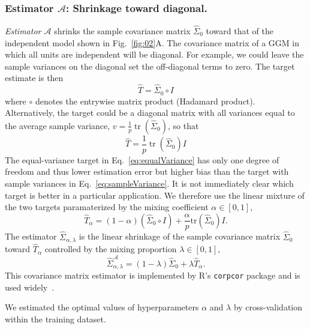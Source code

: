 \documentclass[10pt]{article}
\DeclareMathOperator{\Tr}{tr}
\begin{document}
\subsection*{}

\subsubsection*{Estimator $\mathcal A$: Shrinkage toward diagonal.}
\emph{Estimator $\mathcal A$} shrinks the sample covariance matrix $\hat\Sigma_0$ toward that of the independent model shown in Fig.~\ref{fig:02}A.  The covariance matrix of a GGM in which all units are independent will be diagonal.  
For example, we  could leave the sample variances on the diagonal set the off-diagonal terms to zero. The target estimate
is then 
\begin{equation}\label{eq:sampleVariance}
\hat T= \hat\Sigma_0\circ I
\end{equation}
where $\circ$ denotes the entrywise matrix product (Hadamard product). 
Alternatively, the target could be a diagonal matrix with all variances equal to the average sample variance, $v = \frac 1 p \Tr(\hat\Sigma_0)$, so that
\begin{equation}\label{eq:equalVariance}
\hat T=\frac 1 p \Tr(\hat\Sigma_0) I
\end{equation}
The equal-variance target in Eq.~\ref{eq:equalVariance} has only one degree of freedom and thus lower estimation error but higher bias than the target with sample variances in Eq.~\ref{eq:sampleVariance}. It is not immediately clear which target is better in a particular application. We therefore use the linear mixture of the two targets paramaterized by the mixing coefficient $\alpha\in[0,1]$,
\begin{equation}
\hat T_\alpha = (1-\alpha)(\hat\Sigma_0 \circ I) + \frac \alpha p \mbox{tr}(\hat \Sigma_0)I.
\end{equation}
The estimator $\hat\Sigma_{\alpha,\lambda}$ is the linear shrinkage of the sample covariance matrix $\hat\Sigma_0$ toward $\hat T_\alpha$ controlled by the mixing proportion $\lambda\in[0,1]$,
\begin{equation}
\hat\Sigma_{\alpha,\lambda}^\mathcal{A} = (1-\lambda)\hat\Sigma_0 + \lambda\hat T_\alpha.
\end{equation}
This covariance matrix estimator is implemented by R's {\tt corpcor} package \cite{Schaefer:2010} and is used widely~\cite{Schafer:2005}.

We estimated the optimal values of hyperparameters $ \alpha$ and $ \lambda$  by  cross-validation within the training dataset. 
\end{document}
